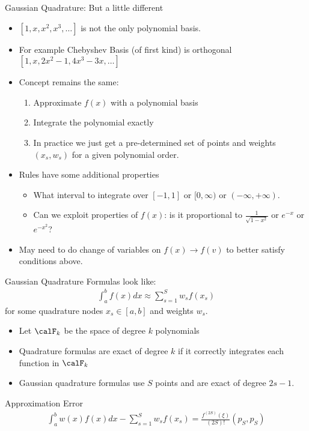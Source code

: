 \begin{frame}{Gaussian Quadrature: But a little different}

\begin{itemize}
\item $[1,x,x^2,x^3,\ldots]$ is not the only \alert{polynomial basis}.
\item For example \alert{Chebyshev Basis} (of first kind) is \alert{orthogonal} $[1,x,2x^2-1,4x^3-3x,\ldots]$
\item Concept remains the same:
\begin{enumerate}
\item Approximate $f(x)$ with a polynomial basis
\item Integrate the polynomial exactly
\item In practice we just get a pre-determined set of points and weights $(x_s,w_s)$ for a given polynomial order.
\end{enumerate}
\item Rules have some additional properties
\begin{itemize}
\item What interval to integrate over $[-1,1]$ or $[0,\infty)$ or $(-\infty,+\infty)$.
\item Can we exploit properties of $f(x)$: is it proportional to $\frac{1}{\sqrt{1-x^2}}$ or $e^{-x}$ or $e^{-x^2}$?
\end{itemize}
\item May need to do change of variables on $f(x) \rightarrow f(v)$ to better satisfy conditions above.
\end{itemize}
\end{frame}


\begin{frame}{Gaussian Quadrature}
\small
Formulas look like:
\begin{eqnarray*}
\int_{a}^b f(x) d x \approx \sum_{s=1}^S  w_s f(x_s)
\end{eqnarray*}
for some quadrature nodes $x_s \in [a,b]$ and weights $w_s$.
\begin{itemize}
\item Let $\calF_k$ be the space of degree $k$ polynomials
\item Quadrature formulas are exact of degree $k$ if it correctly integrates each function in $\calF_k$
\item Gaussian quadrature formulas use $S$ points and are exact of degree $2s-1$.
\end{itemize}
Approximation Error
\begin{eqnarray*}
\int_a^b w(x) f(x)  dx - \sum_{s=1}^S w_s f(x_s) = \frac{f^{(2S)}(\xi)}{(2S)!} (p_S,p_S) 
\end{eqnarray*}
\end{frame}


